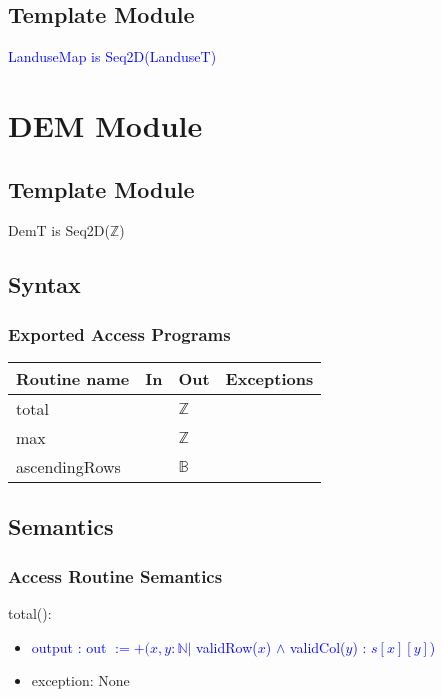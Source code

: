 \documentclass[12pt]{article}
\begin{document}
\subsection* {Template Module}

\noindent \textcolor{blue}{LanduseMap is Seq2D(LanduseT)}


\newpage

\section* {DEM Module}

\subsection* {Template Module}

DemT is Seq2D($\mathbb{Z}$)

\subsection* {Syntax}

\subsubsection* {Exported Access Programs}

\begin{tabular}{| l | l | l | p{6cm} |}
\hline
\textbf{Routine name} & \textbf{In} & \textbf{Out} & \textbf{Exceptions}\\
\hline
total & & $\mathbb{Z}$ & \\
\hline
max &  & $\mathbb{Z}$ & \\
\hline
ascendingRows & & $\mathbb{B}$ & \\
\hline
\end{tabular}

\subsection* {Semantics}

\subsubsection* {Access Routine Semantics}

\noindent total(): 
\begin{itemize}
\item \textcolor{blue}{output : out $:= +(x, y : \mathbb{N} |$ validRow($x$) $\land$ validCol($y$) : $s[x][y]$)}
\item exception: None
\end{itemize}
\end{document}
